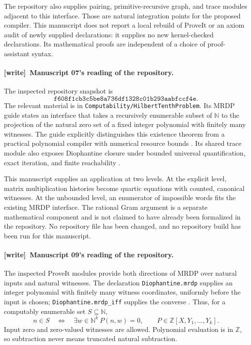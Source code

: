 \documentclass[11pt,letterpaper]{article}
\numberwithin{equation}{section}
\theoremstyle{definition}
\theoremstyle{remark}
\newcommand{\N}{\mathbb N}
\newcommand{\Z}{\mathbb Z}
\newcommand{\code}[1]{\nolinkurl{#1}}
\newcommand{\wtag}{\textup{[write]}}
\newcommand{\snapshot}{\texttt{f608f1cb3c5be8a736df1328c01b293aabfccf4e}}
\newcommand{\repocommit}{\snapshot}
\newcommand{\cenum}{computably enumerable}
\begin{document}
The repository also supplies pairing, primitive-recursive graph, and trace
modules adjacent to this interface. Those are natural integration points
for the proposed compiler. This manuscript does not report a local rebuild
of ProveIt or an axiom audit of newly supplied declarations: it supplies no
new kernel-checked declarations. Its mathematical proofs are independent
of a choice of proof-assistant syntax.


\paragraph{\wtag\ Manuscript 07's reading of the repository.}
The inspected repository snapshot is
\[
\repocommit.
\]
The relevant material is in \code{Computability/HilbertTenthProblem}. Its MRDP guide states an interface that takes a recursively enumerable subset of $\N$ to the projection of the natural zero set of a fixed integer polynomial with finitely many witnesses. The guide explicitly distinguishes this existence theorem from a practical polynomial compiler with numerical resource bounds \cite{proveit-mrdp-guide}. Its shared trace module also exposes Diophantine closure under bounded universal quantification, exact iteration, and finite reachability \cite{proveit-trace}.

This manuscript supplies an application at two levels. At the explicit level, matrix multiplication histories become quartic equations with counted, canonical witnesses. At the unbounded level, an enumerator of impossible words fits the existing MRDP interface. The rational Gram argument is a separate mathematical component and is not claimed to have already been formalized in the repository. No repository file has been changed, and no repository build has been run for this manuscript.

\paragraph{\wtag\ Manuscript 09's reading of the repository.}
The inspected ProveIt modules provide both directions of MRDP over natural
inputs and natural witnesses.  The declaration \code{Diophantine.mrdp} supplies
an integer polynomial with finitely many witness coordinates, uniformly before
the input is chosen; \code{Diophantine.mrdp_iff} supplies the converse
\cite{proveit-mrdp,proveit-mrdp-guide}.  Thus, for a \cenum{} set $S\subseteq\N$,
\begin{equation}
 n\in S\quad\Longleftrightarrow\quad
 \exists w\in\N^k\ P(n,w)=0,
 \qquad P\in\Z[X,Y_1,\ldots,Y_k].
 \label{pqc:cb:eq:mrdp}
\end{equation}
Input zero and zero-valued witnesses are allowed.  Polynomial evaluation is
in $\Z$, so subtraction never means truncated natural subtraction.
\end{document}

